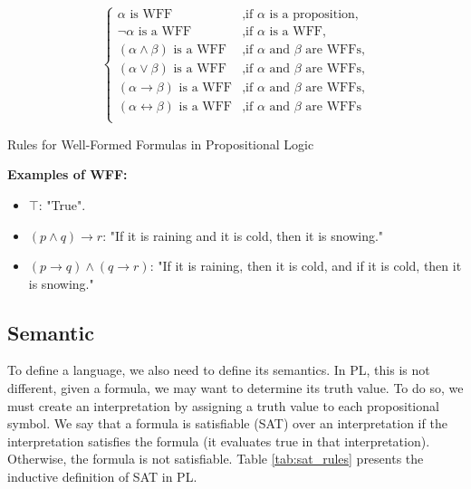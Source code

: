 \begin{table}[h] 
\[
\left\{
\begin{array}{ll}
\alpha \text{ is WFF} & \text{,if } \alpha \text{ is a proposition,}\\
\neg \alpha \text{ is a WFF} & \text{,if } \alpha \text{ is a WFF,}\\
(\alpha \land \beta) \text{ is a WFF} & \text{,if } \alpha \text{ and } \beta \text{ are WFFs,}\\
(\alpha \lor \beta) \text{ is a WFF} & \text{,if } \alpha \text{ and } \beta \text{ are WFFs,} \\
(\alpha \rightarrow \beta) \text{ is a WFF} & \text{,if } \alpha \text{ and } \beta \text{ are WFFs,} \\
(\alpha \leftrightarrow \beta) \text{ is a WFF} & \text{,if } \alpha \text{ and } \beta \text{ are WFFs} \\
\end{array}
\right.
\]

\caption{Rules for Well-Formed Formulas in Propositional Logic}
\label{tab:wff_rules}
\end{table}

\textbf{Examples of WFF:}
\begin{itemize}
    \item \(\top\): "True".
    \item \((p \land q) \to r\): "If it is raining and it is cold, then it is snowing."
    \item \((p \to q) \land (q \to r)\): "If it is raining, then it is cold, and if it is cold, then it is snowing."
\end{itemize}

\subsection{Semantic}
To define a language, we also need to define its semantics. In \gls{PL}, this is not different, given a formula, we may want to determine its truth value. To do so, we must create an interpretation by assigning a truth value to each propositional symbol.
We say that a formula is satisfiable (SAT) over an interpretation if the interpretation satisfies the formula (it evaluates true in that interpretation). Otherwise, the formula is not satisfiable. Table \ref{tab:sat_rules} presents the inductive definition of SAT in \gls{PL}.


